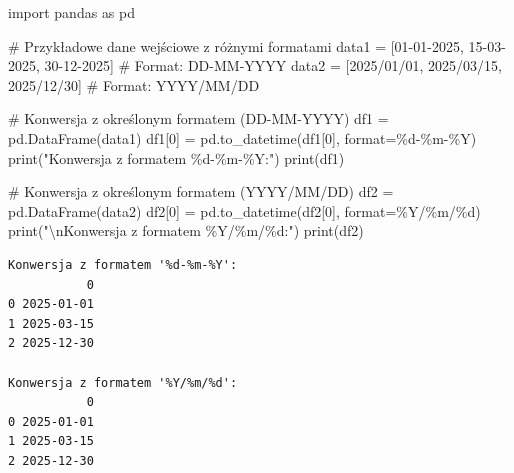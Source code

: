 \documentclass[
  polish,
  letterpaper,
  DIV=11,
  numbers=noendperiod]{scrreprt}
\newenvironment{Shaded}{\begin{snugshade}}{\end{snugshade}}
\newcommand{\BuiltInTok}[1]{\textcolor[rgb]{0.00,0.23,0.31}{#1}}
\newcommand{\CharTok}[1]{\textcolor[rgb]{0.13,0.47,0.30}{#1}}
\newcommand{\CommentTok}[1]{\textcolor[rgb]{0.37,0.37,0.37}{#1}}
\newcommand{\DecValTok}[1]{\textcolor[rgb]{0.68,0.00,0.00}{#1}}
\newcommand{\ImportTok}[1]{\textcolor[rgb]{0.00,0.46,0.62}{#1}}
\newcommand{\NormalTok}[1]{\textcolor[rgb]{0.00,0.23,0.31}{#1}}
\newcommand{\OperatorTok}[1]{\textcolor[rgb]{0.37,0.37,0.37}{#1}}
\newcommand{\SpecialCharTok}[1]{\textcolor[rgb]{0.37,0.37,0.37}{#1}}
\newcommand{\StringTok}[1]{\textcolor[rgb]{0.13,0.47,0.30}{#1}}
\begin{document}
\begin{Shaded}
\begin{Highlighting}[]
\ImportTok{import}\NormalTok{ pandas }\ImportTok{as}\NormalTok{ pd}

\CommentTok{\# Przykładowe dane wejściowe z różnymi formatami}
\NormalTok{data1 }\OperatorTok{=}\NormalTok{ [}\StringTok{\textquotesingle{}01{-}01{-}2025\textquotesingle{}}\NormalTok{, }\StringTok{\textquotesingle{}15{-}03{-}2025\textquotesingle{}}\NormalTok{, }\StringTok{\textquotesingle{}30{-}12{-}2025\textquotesingle{}}\NormalTok{]  }\CommentTok{\# Format: DD{-}MM{-}YYYY}
\NormalTok{data2 }\OperatorTok{=}\NormalTok{ [}\StringTok{\textquotesingle{}2025/01/01\textquotesingle{}}\NormalTok{, }\StringTok{\textquotesingle{}2025/03/15\textquotesingle{}}\NormalTok{, }\StringTok{\textquotesingle{}2025/12/30\textquotesingle{}}\NormalTok{]  }\CommentTok{\# Format: YYYY/MM/DD}

\CommentTok{\# Konwersja z określonym formatem (DD{-}MM{-}YYYY)}
\NormalTok{df1 }\OperatorTok{=}\NormalTok{ pd.DataFrame(data1)}
\NormalTok{df1[}\DecValTok{0}\NormalTok{] }\OperatorTok{=}\NormalTok{ pd.to\_datetime(df1[}\DecValTok{0}\NormalTok{], }\BuiltInTok{format}\OperatorTok{=}\StringTok{\textquotesingle{}}\SpecialCharTok{\%d}\StringTok{{-}\%m{-}\%Y\textquotesingle{}}\NormalTok{)}
\BuiltInTok{print}\NormalTok{(}\StringTok{"Konwersja z formatem \textquotesingle{}}\SpecialCharTok{\%d}\StringTok{{-}\%m{-}\%Y\textquotesingle{}:"}\NormalTok{)}
\BuiltInTok{print}\NormalTok{(df1)}

\CommentTok{\# Konwersja z określonym formatem (YYYY/MM/DD)}
\NormalTok{df2 }\OperatorTok{=}\NormalTok{ pd.DataFrame(data2)}
\NormalTok{df2[}\DecValTok{0}\NormalTok{] }\OperatorTok{=}\NormalTok{ pd.to\_datetime(df2[}\DecValTok{0}\NormalTok{], }\BuiltInTok{format}\OperatorTok{=}\StringTok{\textquotesingle{}\%Y/\%m/}\SpecialCharTok{\%d}\StringTok{\textquotesingle{}}\NormalTok{)}
\BuiltInTok{print}\NormalTok{(}\StringTok{"}\CharTok{\textbackslash{}n}\StringTok{Konwersja z formatem \textquotesingle{}\%Y/\%m/}\SpecialCharTok{\%d}\StringTok{\textquotesingle{}:"}\NormalTok{)}
\BuiltInTok{print}\NormalTok{(df2)}
\end{Highlighting}
\end{Shaded}

\begin{verbatim}
Konwersja z formatem '%d-%m-%Y':
           0
0 2025-01-01
1 2025-03-15
2 2025-12-30

Konwersja z formatem '%Y/%m/%d':
           0
0 2025-01-01
1 2025-03-15
2 2025-12-30
\end{verbatim}
\end{document}
